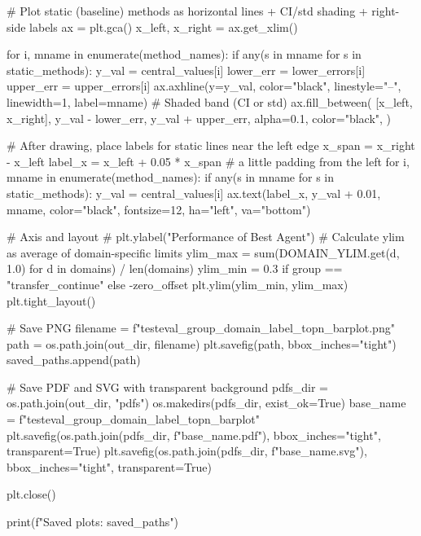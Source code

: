         # Plot static (baseline) methods as horizontal lines + CI/std shading + right-side labels
        ax = plt.gca()
        x_left, x_right = ax.get_xlim()

        for i, mname in enumerate(method_names):
            if any(s in mname for s in static_methods):
                y_val = central_values[i]
                lower_err = lower_errors[i]
                upper_err = upper_errors[i]
                ax.axhline(y=y_val, color="black", linestyle="--", linewidth=1, label=mname)
                # Shaded band (CI or std)
                ax.fill_between(
                    [x_left, x_right],
                    y_val - lower_err,
                    y_val + upper_err,
                    alpha=0.1,
                    color="black",
                )

        # After drawing, place labels for static lines near the left edge
        x_span = x_right - x_left
        label_x = x_left + 0.05 * x_span  # a little padding from the left
        for i, mname in enumerate(method_names):
            if any(s in mname for s in static_methods):
                y_val = central_values[i]
                ax.text(label_x, y_val + 0.01, mname, color="black", fontsize=12, ha="left", va="bottom")

        # Axis and layout
        # plt.ylabel("Performance of Best Agent")
        # Calculate ylim as average of domain-specific limits
        ylim_max = sum(DOMAIN_YLIM.get(d, 1.0) for d in domains) / len(domains)
        ylim_min = 0.3 if group == "transfer_continue" else -zero_offset
        plt.ylim(ylim_min, ylim_max)
        plt.tight_layout()

        # Save PNG
        filename = f"testeval_{group}_{domain_label}_top{n}_barplot.png"
        path = os.path.join(out_dir, filename)
        plt.savefig(path, bbox_inches="tight")
        saved_paths.append(path)

        # Save PDF and SVG with transparent background
        pdfs_dir = os.path.join(out_dir, "pdfs")
        os.makedirs(pdfs_dir, exist_ok=True)
        base_name = f"testeval_{group}_{domain_label}_top{n}_barplot"
        plt.savefig(os.path.join(pdfs_dir, f"{base_name}.pdf"), bbox_inches="tight", transparent=True)
        plt.savefig(os.path.join(pdfs_dir, f"{base_name}.svg"), bbox_inches="tight", transparent=True)

        plt.close()

    print(f"Saved plots: {saved_paths}")
